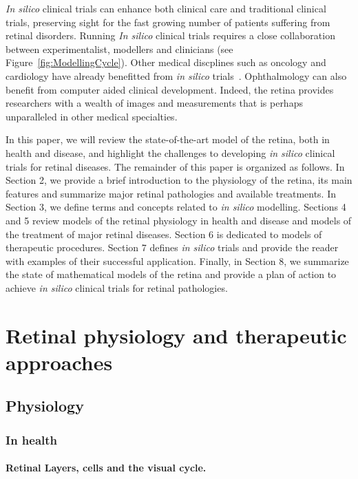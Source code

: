 \documentclass{article}
\begin{document}
\textit{In silico} clinical trials can enhance both clinical care and traditional clinical trials, preserving sight for the fast growing number of patients suffering from retinal disorders.
Running \textit{In silico} clinical trials requires a close collaboration between experimentalist, modellers and clinicians (see Figure~\ref{fig:ModellingCycle}).
Other medical discplines such as oncology and cardiology have already benefitted from \textit{in silico} trials~\cite{Gaffney2022,Ravvaz2017}.
Ophthalmology can also benefit from computer aided clinical development.
Indeed, the retina provides researchers with a wealth of images and measurements that is perhaps unparalleled in other medical specialties.

In this paper, we will review the state-of-the-art model of the retina, both in health and disease, and highlight the challenges to developing \textit{in silico} clinical trials for retinal diseases.
The remainder of this paper is organized as follows.
In Section 2, we provide a brief introduction to the physiology of the retina, its main features and summarize major retinal pathologies and available treatments.
In Section 3, we define terms and concepts related to \textit{in silico} modelling.
Sections 4 and 5 review models of the retinal physiology in health and disease and models of the treatment of major retinal diseases.
Section 6 is dedicated to models of therapeutic procedures.
Section 7 defines \textit{in silico} trials and provide the reader with examples of their successful application.
Finally, in Section 8, we summarize the state of mathematical models of the retina and provide a plan of action to achieve \textit{in silico} clinical trials for retinal pathologies.

\section{Retinal physiology and therapeutic approaches}\label{sec:RetinalPhysiology}

\subsection{Physiology}

\subsubsection{In health}

\paragraph*{Retinal Layers, cells and the visual cycle.}
\end{document}

